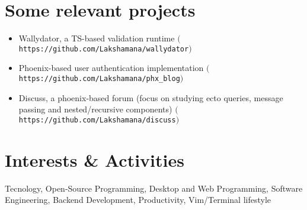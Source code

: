 \documentclass[a4paper,10pt]{article}
\begin{document}
\section{Some relevant projects}
\begin{flushleft}
\begin{itemize}
  \item Wallydator, a TS-based validation runtime $($\texttt{https://github.com/Lakshamana/wallydator}$)$
  \item Phoenix-based user authentication implementation $($\texttt{https://github.com/Lakshamana/phx\_blog}$)$
  \item Discuss, a phoenix-based forum (focus on studying ecto queries, message passing and nested/recursive components) $($\texttt{https://github.com/Lakshamana/discuss}$)$
\end{itemize}
\end{flushleft}

\section{Interests \& Activities}
\raggedright{Tecnology, Open-Source Programming, Desktop and Web Programming, Software Engineering, Backend Development, Productivity, Vim/Terminal lifestyle}

\end{document}
